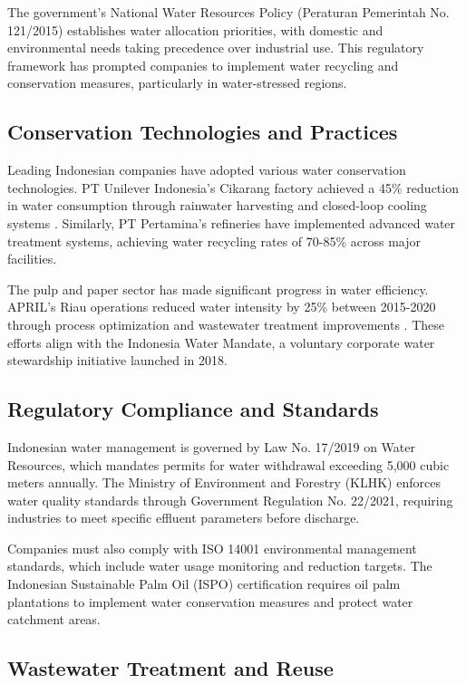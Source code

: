 The government's National Water Resources Policy (Peraturan Pemerintah No. 121/2015) establishes water allocation priorities, with domestic and environmental needs taking precedence over industrial use. This regulatory framework has prompted companies to implement water recycling and conservation measures, particularly in water-stressed regions.

\subsection{Conservation Technologies and Practices}

Leading Indonesian companies have adopted various water conservation technologies. PT Unilever Indonesia's Cikarang factory achieved a 45\% reduction in water consumption through rainwater harvesting and closed-loop cooling systems \cite{Unilever2022}. Similarly, PT Pertamina's refineries have implemented advanced water treatment systems, achieving water recycling rates of 70-85\% across major facilities.

The pulp and paper sector has made significant progress in water efficiency. APRIL's Riau operations reduced water intensity by 25\% between 2015-2020 through process optimization and wastewater treatment improvements \cite{APRIL2021}. These efforts align with the Indonesia Water Mandate, a voluntary corporate water stewardship initiative launched in 2018.

\subsection{Regulatory Compliance and Standards}

Indonesian water management is governed by Law No. 17/2019 on Water Resources, which mandates permits for water withdrawal exceeding 5,000 cubic meters annually. The Ministry of Environment and Forestry (KLHK) enforces water quality standards through Government Regulation No. 22/2021, requiring industries to meet specific effluent parameters before discharge.

Companies must also comply with ISO 14001 environmental management standards, which include water usage monitoring and reduction targets. The Indonesian Sustainable Palm Oil (ISPO) certification requires oil palm plantations to implement water conservation measures and protect water catchment areas.

\subsection{Wastewater Treatment and Reuse}

